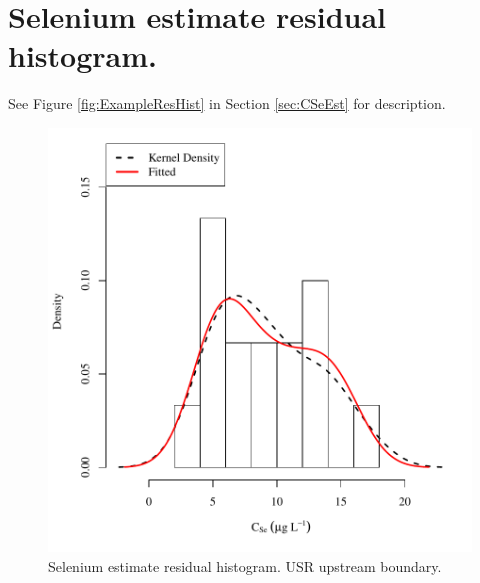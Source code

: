 \section{Selenium estimate residual histogram.}
\label{App:AppResHist}

See Figure \ref{fig:ExampleResHist} in Section \ref{sec:CSeEst} for description.

\begin{figure}[htbp]
	\begin{center}
	\includegraphics[width=6in]{"Figures/Results_USR/Conc Model ResDist U163"}
	\caption{Selenium estimate residual histogram.  USR upstream boundary.}
	\end{center}
\end{figure}
\newpage

